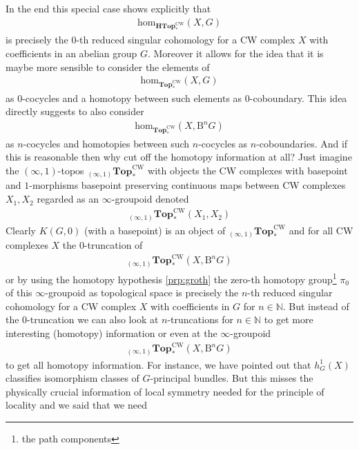 In the end this special case shows explicitly that
\begin{align*}
  \mathrm{hom}_{\mathbf{HTop}_{\ast}^{\textrm{CW}}}
  \left(
    X,
    G
  \right)
\end{align*}
is precisely the $0$-th reduced singular cohomology for a CW complex $X$ with coefficients in an abelian group $G$. Moreover it allows for the idea that it is maybe more sensible to consider the elements of
\begin{align*}
  \mathrm{hom}_{\mathbf{Top}_{\ast}^{\textrm{CW}}}
  \left(
    X,
    G
  \right)
\end{align*}
as $0$-cocycles and a homotopy between such elements as $0$-coboundary. This idea directly suggests to also consider
\begin{align*}
  \mathrm{hom}_{\mathbf{Top}_{\ast}^{\textrm{CW}}}
  \left(
    X,
    \mathrm{B}^{n}G
  \right)
\end{align*}
as $n$-cocycles and homotopies between such $n$-cocycles as $n$-coboundaries. And if this is reasonable then why cut off the homotopy information at all? Just imagine the $(\infty,1)$-topos ${}_{(\infty,1)}\mathbf{Top}_{\ast}^{\textrm{CW}}$ with objects the CW complexes with basepoint and $1$-morphisms basepoint preserving continuous maps between CW complexes $X_{1},X_{2}$ regarded as an $\infty$-groupoid denoted
\begin{align*}
  {}_{(\infty,1)}\mathbf{Top}_{\ast}^{\textrm{CW}}(X_{1},X_{2})
\end{align*}
Clearly $K(G,0)$ (with a basepoint) is an object of ${}_{(\infty,1)}\mathbf{Top}_{\ast}^{\textrm{CW}}$ and for all CW complexes $X$ the $0$-truncation of
\begin{align*}
  {}_{(\infty,1)}\mathbf{Top}_{\ast}^{\textrm{CW}}
  \left(
    X,
    \mathrm{B}^{n}G
  \right)
\end{align*}
or by using the homotopy hypothesis \ref{prp:groth} the zero-th homotopy group\footnote{the path components} $\pi_{0}$ of this $\infty$-groupoid as topological space is precisely the $n$-th reduced singular cohomology for a CW complex $X$ with coefficients in $G$ for $n \in \mathbb{N}$. But instead of the $0$-truncation we can also look at $n$-truncations for $n \in \mathbb{N}$ to get more interesting (homotopy) information or even at the $\infty$-groupoid
\begin{align*}
  {}_{(\infty,1)}\mathbf{Top}_{\ast}^{\textrm{CW}}
  \left(
    X,
    \mathrm{B}^{n}G
  \right)
\end{align*}
to get all homotopy information. For instance, we have pointed out that $h_{G}^{1}(X)$ classifies isomorphism classes of $G$-principal bundles. But this misses the physically crucial information of local symmetry needed for the principle of locality and we said that we need
